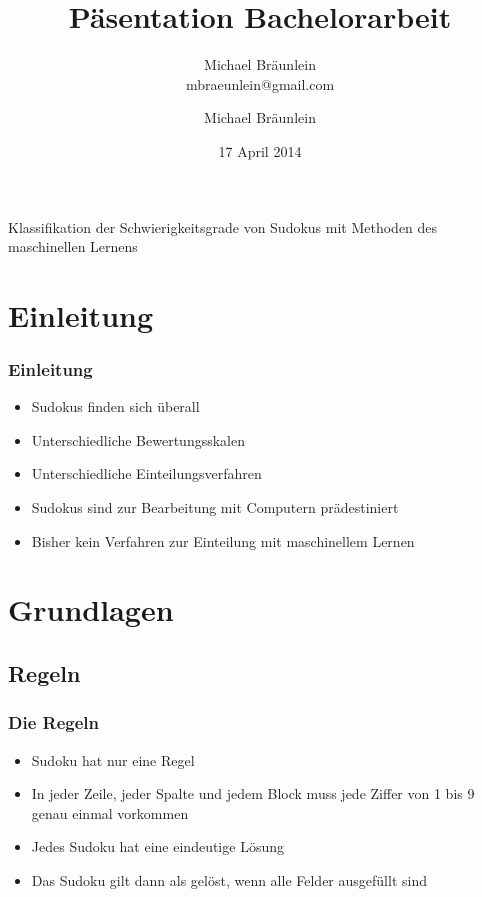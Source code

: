 \documentclass[accentcolor=tud6b,colorbacktitle,inverttitle,landscape,german,presentation,t]{tudbeamer}
\begin{document}
\title[Klassifikation der Schwierigkeitsgrade von Sudokus mit Methoden des maschinellen Lernens]{Päsentation Bachelorarbeit}
\subtitle{Michael Bräunlein\\mbraeunlein@gmail.com}

\author[M. Bräunlein]{Michael Bräunlein}


\date{17 April 2014}

\begin{titleframe}
\centering \LARGE Klassifikation der Schwierigkeitsgrade von Sudokus mit Methoden des maschinellen Lernens
\end{titleframe}

\section{Einleitung}
	\begin{frame}
	\frametitle{Einleitung}
	\begin{itemize}
	\item Sudokus finden sich überall
	\item Unterschiedliche Bewertungsskalen
	\item Unterschiedliche Einteilungsverfahren
	\item Sudokus sind zur Bearbeitung mit Computern prädestiniert
	\item Bisher kein Verfahren zur Einteilung mit maschinellem Lernen
	\end{itemize}
	\end{frame}

\section{Grundlagen}
	\subsection{Regeln}
		\begin{frame}
		\frametitle{Die Regeln}
		\begin{itemize}
		\item Sudoku hat nur eine Regel
		\item In jeder Zeile, jeder Spalte und jedem Block muss jede Ziffer von 1 bis 9 genau einmal vorkommen
		\item Jedes Sudoku hat eine eindeutige Lösung
		\item Das Sudoku gilt dann als gelöst, wenn alle Felder ausgefüllt sind
		\end{itemize}
		\end{frame}
\end{document}
